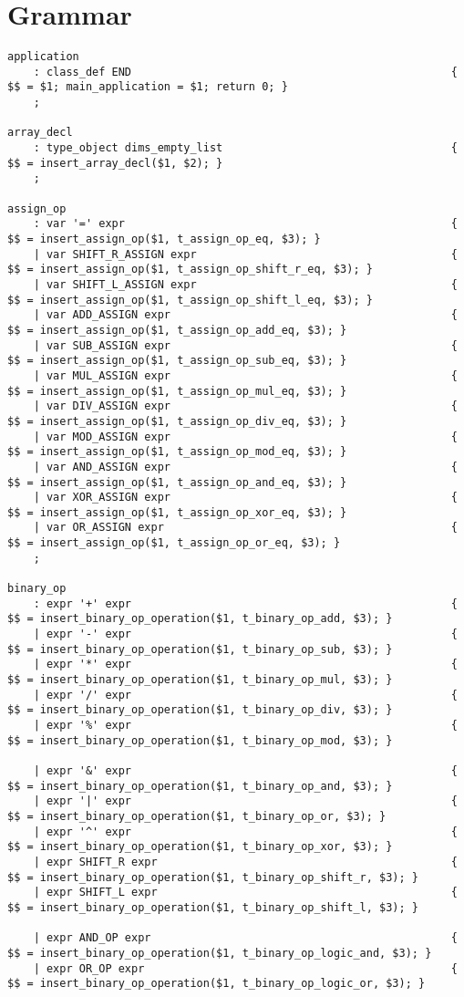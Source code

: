 \documentclass[a4paper]{article}
\begin{document}
\section {Grammar}
\begin{verbatim}
application
	: class_def END													{ $$ = $1; main_application = $1; return 0; }
	;

array_decl
	: type_object dims_empty_list									{ $$ = insert_array_decl($1, $2); }
	;

assign_op
	: var '=' expr													{ $$ = insert_assign_op($1, t_assign_op_eq, $3); }
	| var SHIFT_R_ASSIGN expr										{ $$ = insert_assign_op($1, t_assign_op_shift_r_eq, $3); }
	| var SHIFT_L_ASSIGN expr										{ $$ = insert_assign_op($1, t_assign_op_shift_l_eq, $3); }
	| var ADD_ASSIGN expr											{ $$ = insert_assign_op($1, t_assign_op_add_eq, $3); }
	| var SUB_ASSIGN expr											{ $$ = insert_assign_op($1, t_assign_op_sub_eq, $3); }
	| var MUL_ASSIGN expr											{ $$ = insert_assign_op($1, t_assign_op_mul_eq, $3); }
	| var DIV_ASSIGN expr											{ $$ = insert_assign_op($1, t_assign_op_div_eq, $3); }
	| var MOD_ASSIGN expr											{ $$ = insert_assign_op($1, t_assign_op_mod_eq, $3); }
	| var AND_ASSIGN expr											{ $$ = insert_assign_op($1, t_assign_op_and_eq, $3); }
	| var XOR_ASSIGN expr											{ $$ = insert_assign_op($1, t_assign_op_xor_eq, $3); }
	| var OR_ASSIGN expr											{ $$ = insert_assign_op($1, t_assign_op_or_eq, $3); }
	;

binary_op
	: expr '+' expr													{ $$ = insert_binary_op_operation($1, t_binary_op_add, $3); }
	| expr '-' expr													{ $$ = insert_binary_op_operation($1, t_binary_op_sub, $3); }
	| expr '*' expr													{ $$ = insert_binary_op_operation($1, t_binary_op_mul, $3); }
	| expr '/' expr													{ $$ = insert_binary_op_operation($1, t_binary_op_div, $3); }
	| expr '%' expr													{ $$ = insert_binary_op_operation($1, t_binary_op_mod, $3); }

	| expr '&' expr													{ $$ = insert_binary_op_operation($1, t_binary_op_and, $3); }
	| expr '|' expr													{ $$ = insert_binary_op_operation($1, t_binary_op_or, $3); }
	| expr '^' expr													{ $$ = insert_binary_op_operation($1, t_binary_op_xor, $3); }
	| expr SHIFT_R expr												{ $$ = insert_binary_op_operation($1, t_binary_op_shift_r, $3); }
	| expr SHIFT_L expr												{ $$ = insert_binary_op_operation($1, t_binary_op_shift_l, $3); }
	
	| expr AND_OP expr												{ $$ = insert_binary_op_operation($1, t_binary_op_logic_and, $3); }
	| expr OR_OP expr												{ $$ = insert_binary_op_operation($1, t_binary_op_logic_or, $3); }


\end{verbatim}
\end{document}
